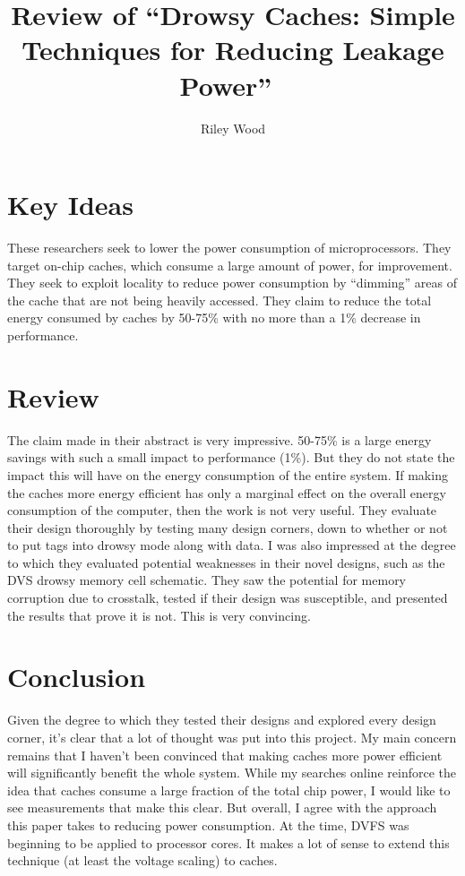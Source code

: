 \documentclass{article}
\title{Review of ``Drowsy Caches: Simple Techniques for Reducing Leakage
Power''~\cite{drowsy}}
\author{Riley Wood}
\begin{document}
\maketitle


\section*{Key Ideas}
These researchers seek to lower the power consumption of microprocessors. They
target on-chip caches, which consume a large amount of power, for improvement.
They seek to exploit locality to reduce power consumption by ``dimming'' areas
of the cache that are not being heavily accessed. They claim to reduce the total
energy consumed by caches by 50-75\% with no more than a 1\% decrease in
performance.

\section*{Review}
The claim made in their abstract is very impressive. 50-75\% is a large energy
savings with such a small impact to performance (1\%). But they do not state the
impact this will have on the energy consumption of the entire system. If making
the caches more energy efficient has only a marginal effect on the overall
energy consumption of the computer, then the work is not very useful. They
evaluate their design thoroughly by testing many design corners, down
to whether or not to put tags into drowsy mode along with data. I was also
impressed at the degree to which they evaluated potential weaknesses in their
novel designs, such as the DVS drowsy memory cell schematic. They saw the
potential for memory corruption due to crosstalk, tested if their design was
susceptible, and presented the results that prove it is not. This is very
convincing.

\section*{Conclusion}
Given the degree to which they tested their designs and explored every design
corner, it's clear that a lot of thought was put into this project. My main
concern remains that I haven't been convinced that making caches more power
efficient will significantly benefit the whole system. While my searches online
reinforce the idea that caches consume a large fraction of the total chip power,
I would like to see measurements that make this clear. But overall, I agree with
the approach this paper takes to reducing power consumption. At the time, DVFS
was beginning to be applied to processor cores. It makes a lot of sense to extend
this technique (at least the voltage scaling) to caches.




\end{document}
